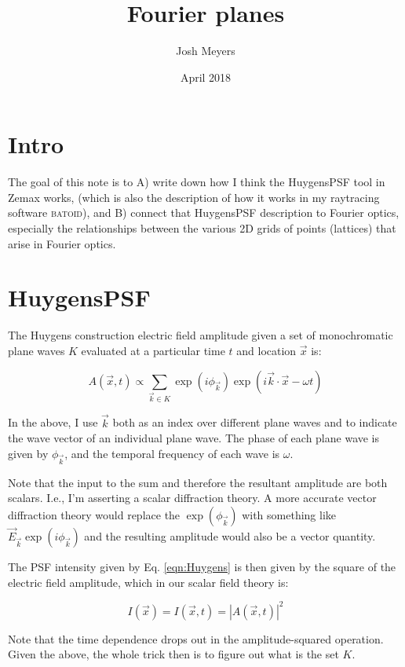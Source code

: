\documentclass{article}
\title{Fourier planes}
\author{Josh Meyers}
\date{April 2018}
\begin{document}
\section{Intro}

The goal of this note is to A) write down how I think the HuygensPSF tool in Zemax works, (which is
also the description of how it works in my raytracing software \textsc{batoid}), and B) connect that
HuygensPSF description to Fourier optics, especially the relationships between the various 2D grids
of points (lattices) that arise in Fourier optics.

\section{HuygensPSF}

The Huygens construction electric field amplitude given a set of monochromatic plane waves $K$
evaluated at a particular time $t$ and location $\vec{x}$ is:

\begin{equation}
    A(\vec{x}, t) \propto \sum_{\vec{k} \in K} \exp\left(i \phi_{\vec{k}}\right) \exp\left( i \vec{k} \cdot \vec{x} - \omega t\right)
    \label{eqn:Huygens}
\end{equation}

In the above, I use $\vec{k}$ both as an index over different plane waves and to indicate the
wave vector of an individual plane wave.  The phase of each plane wave is given by $\phi_{\vec{k}}$,
and the temporal frequency of each wave is $\omega$.

Note that the input to the sum and therefore the resultant amplitude are both scalars.  I.e., I'm
asserting a scalar diffraction theory.  A more accurate vector diffraction theory would replace the
$\exp\left(\phi_{\vec{k}}\right)$ with something like $\vec{E}_{\vec{k}} \exp\left(i
\phi_{\vec{k}}\right)$ and the resulting amplitude would also be a vector quantity.

The PSF intensity given by Eq. \ref{eqn:Huygens} is then given by the square of the electric field
amplitude, which in our scalar field theory is:

\begin{equation}
    I(\vec{x}) = I(\vec{x}, t) = |A(\vec{x}, t)|^2
\end{equation}

Note that the time dependence drops out in the amplitude-squared operation.  Given the above, the
whole trick then is to figure out what is the set $K$.
\end{document}
